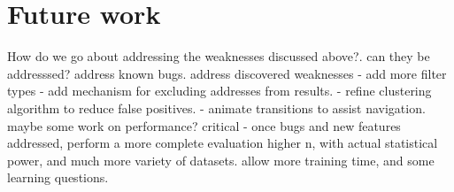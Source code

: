 \section{Future work}
How do we go about addressing the weaknesses discussed above?.
can they be addresssed?
address known bugs.
address discovered weaknesses
 - add more filter types
 - add mechanism for excluding addresses from results.
 - refine clustering algorithm to reduce false positives. 
 - animate transitions to assist navigation.
maybe some work on performance?
critical - once bugs and new features addressed, perform a more complete evaluation
higher n, with actual statistical power, and much more variety of datasets. allow more training time, and some learning questions.